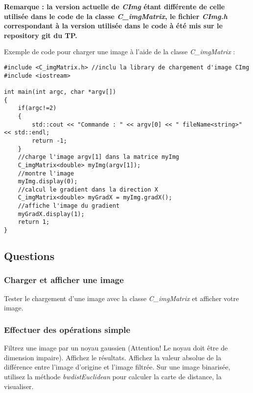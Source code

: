 \documentclass[10pt,a4paper]{article}
\begin{document}
\noindent \textbf{Remarque : la version actuelle de \textit{CImg} \'{e}tant diff\'{e}rente de celle utilis\'{e}e dans le code de la classe \textit{C\_imgMatrix}, le fichier \textit{CImg.h} correspondant \`{a} la version utilis\'{e}e dans le code \`{a} \'{e}t\'{e} mis sur le repository git du TP.}

\clearpage
\noindent Exemple de code pour charger une image \`{a} l'aide de la classe \textit{C\_imgMatrix} : 
\begin{verbatim}
#include <C_imgMatrix.h> //inclu la library de chargement d'image CImg
#include <iostream>

int main(int argc, char *argv[])
{
    if(argc!=2)
    {
        std::cout << "Commande : " << argv[0] << " fileName<string>" << std::endl;
        return -1;
    }
    //charge l'image argv[1] dans la matrice myImg
    C_imgMatrix<double> myImg(argv[1]);
    //montre l'image
    myImg.display(0);
    //calcul le gradient dans la direction X
    C_imgMatrix<double> myGradX = myImg.gradX();
    //affiche l'image du gradient
    myGradX.display(1);
    return 1;
}
\end{verbatim}

\subsection{Questions}
\subsubsection{Charger et afficher une image}
Tester le chargement d'une image avec la classe \textit{C\_imgMatrix} et afficher votre image.
\subsubsection{Effectuer des op\'{e}rations simple}
Filtrez une image par un noyau gaussien (Attention! Le noyau doit \^{e}tre de dimension impaire). Affichez le r\'{e}sultats. Affichez la valeur absolue de la diff\'{e}rence entre l'image d'origine et l'image filtr\'{e}e. Sur une image binaris\'{e}e, utilisez la m\'{e}thode \textit{bwdistEuclidean} pour calculer la carte de distance, la visualiser.
\end{document}
